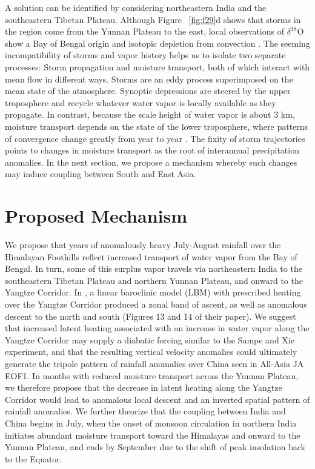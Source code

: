 	 A solution can be identified by considering northeastern India and the southeastern Tibetan Plateau. Although Figure ~\ref{fig:f29}d shows that storms in the region come from the Yunnan Plateau to the east, local observations of $\delta^{18}$O show a Bay of Bengal origin and isotopic depletion from convection \parencite{Gao2011}. The seeming incompatibility of storms and vapor history helps us to isolate two separate processes: Storm propagation and moisture transport, both of which interact with mean flow in different ways. Storms are an eddy process superimposed on the mean state of the atmosphere. Synoptic depressions are steered by the upper troposphere and recycle whatever water vapor is locally available as they propagate. In contrast, because the scale height of water vapor is about 3 km, moisture transport depends on the state of the lower troposphere, where patterns of convergence change greatly from year to year \parencite{Annamalai2001,Yoon2005}. The fixity of storm trajectories points to changes in moisture transport as the root of interannual precipitation anomalies. In the next section, we propose a mechanism whereby such changes may induce coupling between South and East Asia.
	 
\section{Proposed Mechanism}

	We propose that years of anomalously heavy July-August rainfall over the Himalayan Foothills reflect increased transport of water vapor from the Bay of Bengal. In turn, some of this surplus vapor travels via northeastern India to the southeastern Tibetan Plateau and northern Yunnan Plateau, and onward to the Yangtze Corridor. In \cite{Sampe2010}, a linear baroclinic model (LBM) with prescribed heating over the Yangtze Corridor produced a zonal band of ascent, as well as anomalous descent to the north and south (Figures 13 and 14 of their paper). We suggest that increased latent heating associated with an increase in water vapor along the Yangtze Corridor may supply a diabatic forcing similar to the Sampe and Xie experiment, and that the resulting vertical velocity anomalies could ultimately generate the tripole pattern of rainfall anomalies over China seen in All-Asia JA EOF1. In months with reduced moisture transport across the Yunnan Plateau, we therefore propose that the decrease in latent heating along the Yangtze Corridor would lead to anomalous local descent and an inverted spatial pattern of rainfall anomalies. We further theorize that the coupling between India and China begins in July, when the onset of monsoon circulation in northern India initiates abundant moisture transport toward the Himalayas and onward to the Yunnan Plateau, and ends by September due to the shift of peak insolation back to the Equator.
	
